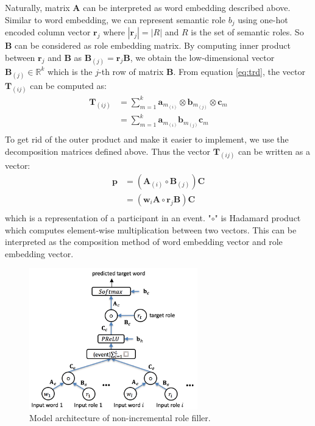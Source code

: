 \documentclass[a4paper]{article}
\begin{document}
Naturally, matrix $\mathbf{A}$ can be interpreted as word embedding described above. Similar to word embedding, we can represent semantic role $b_j$ using one-hot encoded column vector $\mathbf{r}_j$ where $|\mathbf{r}_j| = |R|$ and $R$ is the set of semantic roles. So $\mathbf{B}$ can be considered as role embedding matrix. By computing inner product between $\mathbf{r}_j$ and $\mathbf{B}$ as $\mathbf{B}_{(j)} = \mathbf{r}_j \mathbf{B}$, we obtain the low-dimensional vector $\mathbf{B}_{(j)} \in \mathbb{R}^k$ which is the $j$-th row of matrix $\mathbf{B}$. From equation \eqref{eq:trd}, the vector $\mathbf{T}_{(ij)}$ can be computed as: 
\begin{equation} \label{eq:rbwe_tensor}
\begin{aligned}
    \mathbf{T}_{(ij)}
        &= \sum_{m=1}^{k} \mathbf{a}_{m_{(i)}} \otimes \mathbf{b}_{m_{(j)}} \otimes \mathbf{c}_m \\
        &= \sum_{m=1}^{k} \mathbf{a}_{m_{(i)}} \mathbf{b}_{m_{(j)}}  \mathbf{c}_m \\
\end{aligned}
\end{equation}
\noindent
To get rid of the outer product and make it easier to implement, we use the decomposition matrices defined above. Thus the vector $\mathbf{T}_{(ij)}$ can be written as a vector: 
\begin{equation} \label{eq:rbwe}
\begin{aligned}
    \mathbf{p} 
        &= (\mathbf{A}_{(i)}\circ \mathbf{B}_{(j)}) \mathbf{C} \\
        &= (\mathbf{w}_i \mathbf{A} \circ \mathbf{r}_j \mathbf{B}) \mathbf{C} \\
\end{aligned}
\end{equation}
which is a representation of a participant in an event. "$\circ$" is Hadamard product which computes element-wise multiplication between two vectors. This can be interpreted as the composition method of word embedding vector and role embedding vector. 



\begin{figure}[t]
\centering
\includegraphics[width=0.65\textwidth]{NNRF.png}
\caption{\label{fig:NNRF} Model architecture of non-incremental role filler.}
\end{figure}
\end{document}
